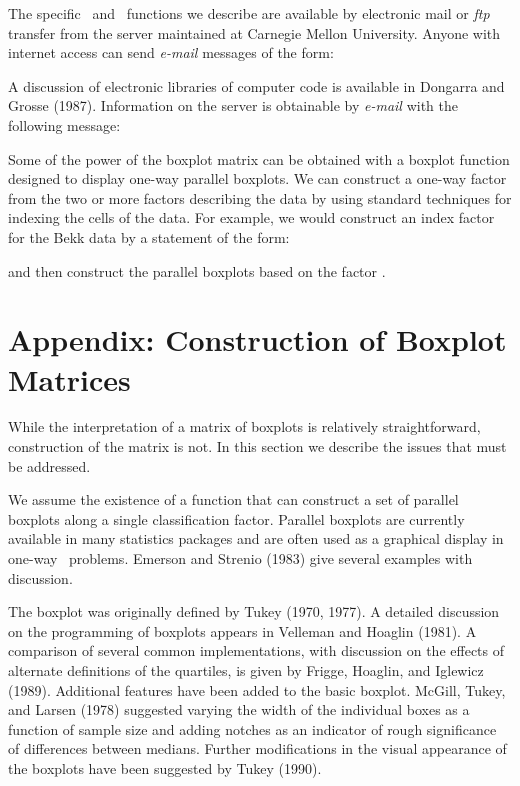The specific \iS\ and \iX\ functions we describe are
available by electronic mail or {\it ftp} transfer
from the  server maintained at Carnegie Mellon University.
Anyone with internet access can send {\it e-mail} messages of the form:

\noindent
\quad{}

\noindent
\quad{}

\noindent
A discussion of electronic libraries of computer code is
available in Dongarra and Grosse (1987).  Information on the
 server is obtainable by {\it e-mail} with the following
message:

\noindent
\quad{}


Some of the power of the boxplot matrix can be obtained with a
boxplot function designed to display one-way parallel boxplots.   We can
construct a one-way factor from the two or more factors describing the data
by using standard techniques for indexing the cells of the data.
For example, we would construct an index factor for the Bekk data by a
statement of the form:

\noindent
\quad{}

\noindent
and then construct the parallel boxplots based on the factor .

\appendix
\section*{Appendix: Construction of Boxplot Matrices}
\label{sec-constr}

While the interpretation of a matrix of boxplots is relatively
straightforward, construction of the matrix is not.  In this
section we describe the issues that must be addressed.

We assume the existence of a function that can construct a set of
parallel boxplots along a single classification factor.  Parallel
boxplots are currently available in many statistics packages and
are often used as a graphical display in one-way \ANOVA\
problems.  Emerson and Strenio (1983) give several examples with
discussion.

The boxplot was originally defined by Tukey (1970, 1977).
A detailed discussion on the programming of boxplots appears in
Velleman and Hoaglin (1981).  A comparison of several common
implementations, with discussion on the effects of alternate
definitions of the quartiles, is given by Frigge, Hoaglin, and
Iglewicz (1989).  Additional features have been added to the
basic boxplot.	McGill, Tukey, and Larsen (1978) suggested
varying the width of the individual boxes as a function of sample
size and adding notches as an indicator of rough significance of
differences between medians.  Further modifications in the visual
appearance of the boxplots have been suggested by Tukey (1990).

